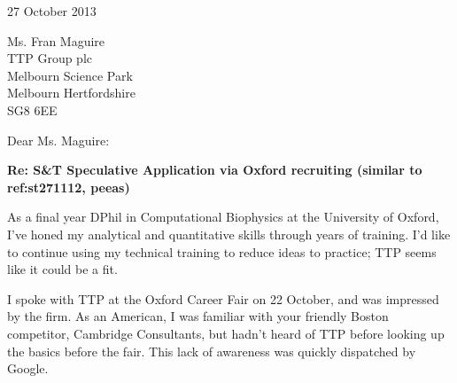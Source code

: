 \documentclass{../res}
\begin{document}
 
\begin{sloppypar}
 
%


\begin{resume} 
 
\vspace{1\baselineskip}

27 October 2013
\vspace{1\baselineskip}

Ms. Fran Maguire \\
TTP Group plc  \\
Melbourn Science Park \\
Melbourn Hertfordshire \\
SG8 6EE
\vspace{1\baselineskip}

Dear Ms. Maguire: %

\textbf{Re: S\&T Speculative Application via Oxford recruiting (similar to ref:st271112, peeas)}

As a final year DPhil in Computational Biophysics at the University of Oxford, I've honed my analytical and quantitative skills through years of training. I'd like to continue using my technical training to reduce ideas to practice; TTP seems like it could be a fit.

I spoke with TTP at the Oxford Career Fair on 22 October, and was impressed by the firm. As an American, I was familiar with your friendly Boston competitor, Cambridge Consultants, but hadn't heard of TTP before looking up the basics before the fair. This lack of awareness was quickly dispatched by Google. 


\end{resume}
\end{sloppypar}
\end{document}
